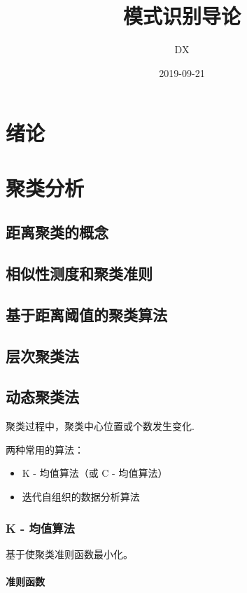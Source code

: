 \documentclass[11pt]{article}
\begin{document}
\title{模式识别导论}
\author{DX}
\date{2019-09-21}

\section{绪论}

\section{聚类分析}

\subsection{距离聚类的概念}

\subsection{相似性测度和聚类准则}

\subsection{基于距离阈值的聚类算法}

\subsection{层次聚类法}

\subsection{动态聚类法}

聚类过程中，聚类中心位置或个数发生变化.

两种常用的算法：
\begin{itemize}
	\item K - 均值算法（或 C - 均值算法）
	\item 迭代自组织的数据分析算法
\end{itemize}

\subsubsection{K - 均值算法}%
\label{ssub:k_jun_zhi_suan_fa_}

基于使聚类准则函数最小化。

\paragraph{准则函数}%
\label{par:zhun_ze_han_shu_}
\end{document}
